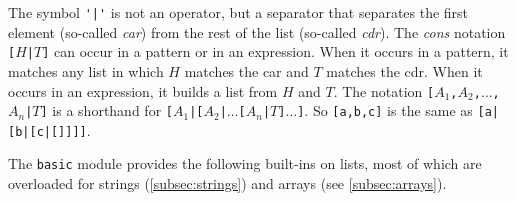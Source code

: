 The symbol \verb+'|'+ is not an operator, but a separator that separates the first element (so-called \emph{car}) from the rest of the list (so-called \emph{cdr}). The \emph{cons} notation {\tt [$H$\verb+|+$T$]} can occur in a pattern or in an expression. When it occurs in a pattern, it matches any list in which $H$ matches the car and $T$ matches the cdr. When it occurs in an expression, it builds a list from $H$ and $T$. The notation {\tt [$A_1$,$A_2$,$\ldots$,$A_n$\verb+|+$T$]} is a shorthand for {\tt [$A_1$\verb+|+[$A_2$\verb+|+$\ldots$[$A_n$\verb+|+$T$]$\ldots$]}. So \texttt{[a,b,c]} is the same as \texttt{[a|[b|[c|[]]]]}.


The \texttt{basic} module provides the following built-ins on lists, most of which are overloaded for strings (\ref{subsec:strings}) and arrays (see \ref{subsec:arrays}).
